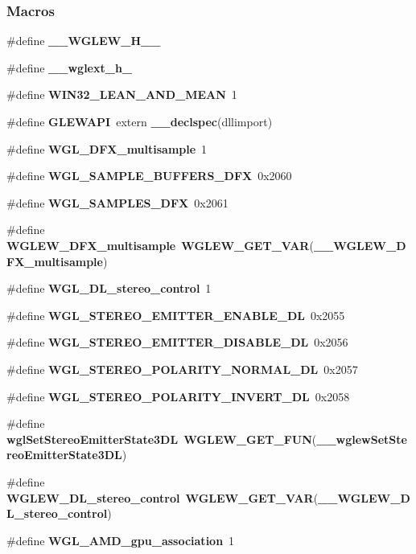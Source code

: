 \subsubsection*{Macros}
\begin{DoxyCompactItemize}
\item 
\#define {\bf \+\_\+\+\_\+\+W\+G\+L\+E\+W\+\_\+\+H\+\_\+\+\_\+}
\item 
\#define {\bf \+\_\+\+\_\+wglext\+\_\+h\+\_\+}
\item 
\#define {\bf W\+I\+N32\+\_\+\+L\+E\+A\+N\+\_\+\+A\+N\+D\+\_\+\+M\+E\+AN}~1
\item 
\#define {\bf G\+L\+E\+W\+A\+PI}~extern {\bf \+\_\+\+\_\+declspec}(dllimport)
\item 
\#define {\bf W\+G\+L\+\_\+D\+F\+X\+\_\+multisample}~1
\item 
\#define {\bf W\+G\+L\+\_\+\+S\+A\+M\+P\+L\+E\+\_\+\+B\+U\+F\+F\+E\+R\+S\+\_\+D\+FX}~0x2060
\item 
\#define {\bf W\+G\+L\+\_\+\+S\+A\+M\+P\+L\+E\+S\+\_\+D\+FX}~0x2061
\item 
\#define {\bf W\+G\+L\+E\+W\+\_\+D\+F\+X\+\_\+multisample}~{\bf W\+G\+L\+E\+W\+\_\+\+G\+E\+T\+\_\+\+V\+AR}({\bf \+\_\+\+\_\+\+W\+G\+L\+E\+W\+\_\+D\+F\+X\+\_\+multisample})
\item 
\#define {\bf W\+G\+L\+\_\+D\+L\+\_\+stereo\+\_\+control}~1
\item 
\#define {\bf W\+G\+L\+\_\+\+S\+T\+E\+R\+E\+O\+\_\+\+E\+M\+I\+T\+T\+E\+R\+\_\+\+E\+N\+A\+B\+L\+E\+\_\+DL}~0x2055
\item 
\#define {\bf W\+G\+L\+\_\+\+S\+T\+E\+R\+E\+O\+\_\+\+E\+M\+I\+T\+T\+E\+R\+\_\+\+D\+I\+S\+A\+B\+L\+E\+\_\+DL}~0x2056
\item 
\#define {\bf W\+G\+L\+\_\+\+S\+T\+E\+R\+E\+O\+\_\+\+P\+O\+L\+A\+R\+I\+T\+Y\+\_\+\+N\+O\+R\+M\+A\+L\+\_\+DL}~0x2057
\item 
\#define {\bf W\+G\+L\+\_\+\+S\+T\+E\+R\+E\+O\+\_\+\+P\+O\+L\+A\+R\+I\+T\+Y\+\_\+\+I\+N\+V\+E\+R\+T\+\_\+DL}~0x2058
\item 
\#define {\bf wgl\+Set\+Stereo\+Emitter\+State3\+DL}~{\bf W\+G\+L\+E\+W\+\_\+\+G\+E\+T\+\_\+\+F\+UN}({\bf \+\_\+\+\_\+wglew\+Set\+Stereo\+Emitter\+State3\+DL})
\item 
\#define {\bf W\+G\+L\+E\+W\+\_\+D\+L\+\_\+stereo\+\_\+control}~{\bf W\+G\+L\+E\+W\+\_\+\+G\+E\+T\+\_\+\+V\+AR}({\bf \+\_\+\+\_\+\+W\+G\+L\+E\+W\+\_\+D\+L\+\_\+stereo\+\_\+control})
\item 
\#define {\bf W\+G\+L\+\_\+\+A\+M\+D\+\_\+gpu\+\_\+association}~1

\end{DoxyCompactItemize}

